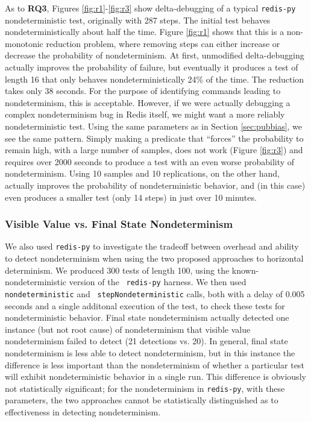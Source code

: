 As to {\bf RQ3}, Figures \ref{fig:r1}-\ref{fig:r3} show delta-debugging of a typical
{\tt redis-py} nondeterministic test, originally with 287 steps.  The initial test behaves
nondeterministically about half the time.  Figure \ref{fig:r1} shows
that this is a non-monotonic reduction problem, where removing steps
can either increase or decrease the probability of nondeterminism.  At
first, unmodified delta-debugging actually improves the probability of
failure, but eventually it produces a test of length 16 that only behaves
nondeterministically 24\% of the time.  The reduction takes only 38
seconds.  For the purpose of identifying commands leading to
nondeterminism, this is acceptable.  However, if we were actually
debugging a complex nondeterminism bug in Redis itself, we might want
a more reliably nondeterministic test.  Using the same parameters as
in Section \ref{sec:pubbias}, we see the same pattern.  Simply making
a predicate that ``forces'' the probability to remain high, with a
large number of samples, does not work (Figure \ref{fig:r3}) and
requires over 2000 seconds to produce a test with an even worse
probability of nondeterminism.  Using 10 samples and 10 replications,
on the other hand, actually improves the probability of
nondeterministic behavior, and (in this case) even produces a smaller test (only 14 steps) in just
over 10 minutes.

\subsubsection{Visible Value vs. Final State Nondeterminism}

We also used {\tt redis-py} to investigate the tradeoff between
overhead and ability to detect nondeterminism when using the two
proposed approaches to horizontal determinism.  We produced 300 tests
of length 100, using the known-nondeterministic version of the {\tt
  redis-py} harness.  We then used {\tt nondeterministic} and {\tt
  stepNondeterministic} calls, both with a delay of 0.005 seconds and
a single additonal execution of the test, to
check these tests for nondeterministic behavior.  Final state
nondeterminism actually detected one instance (but not root cause) of nondeterminism that
visible value nondeterminism failed to detect (21 detections
vs. 20). In general, final state
nondeterminism is less able to detect nondeterminism, but in this
instance the difference is less important than the nondeterminism of
whether a particular test will exhibit nondeterministic behavior in a
single run.  This difference is obviously not statistically
significant; for the nondeterminism in {\tt redis-py}, with these
parameters, the two approaches cannot be statistically distinguished
as to effectiveness in detecting nondeterminism.

